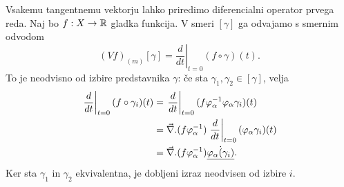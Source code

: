 Vsakemu tangentnemu vektorju lahko priredimo diferencialni operator prvega reda.
Naj bo $f: X \to \mathbb{R}$ gladka funkcija.
V smeri $[\gamma]$ ga odvajamo s smernim odvodom
\[
  (Vf)_{(m)} [\gamma] = \left. \frac{d}{dt} \right|_{t=0} (f \circ \gamma)(t).
\]
To je neodvisno od izbire predstavnika $\gamma$:
če sta $\gamma_1, \gamma_2 \in [\gamma]$, velja
\begin{align*}
  \left. \frac{d}{dt} \right|_{t=0} (f \circ \gamma_i)(t)
  &= \left. \frac{d}{dt} \right|_{t=0} (f \varphi_\alpha^{-1} \varphi_\alpha
  \gamma_i)(t) \\
  &= \vec{\nabla}{} .(f \varphi_\alpha^{-1}) \left. \frac{d}{dt} \right|_{t=0}
  (\varphi_\alpha \gamma_i)(t) \\
  &= \vec{\nabla}{} .(f \varphi_\alpha^{-1}) \dot{\underline{\varphi_\alpha(\gamma_i)}}.
\end{align*}
Ker sta $\gamma_1$ in $\gamma_2$ ekvivalentna, je dobljeni izraz neodvisen od
izbire $i$.

